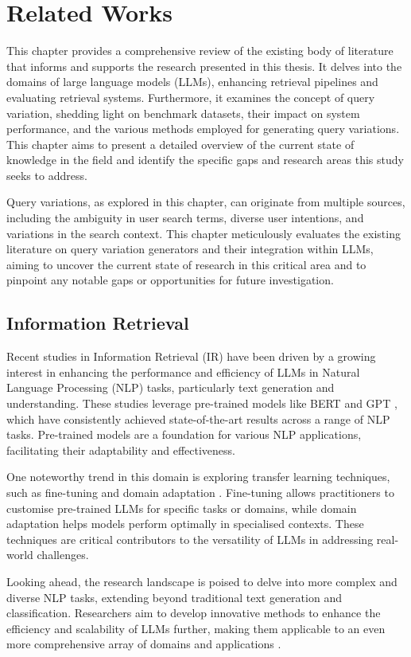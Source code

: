 \chapter{Related Works}
This chapter provides a comprehensive review of the existing body of literature that informs and supports the research presented in this thesis. It delves into the domains of large language models (LLMs), enhancing retrieval pipelines and evaluating retrieval systems. Furthermore, it examines the concept of query variation, shedding light on benchmark datasets, their impact on system performance, and the various methods employed for generating query variations. This chapter aims to present a detailed overview of the current state of knowledge in the field and identify the specific gaps and research areas this study seeks to address.

Query variations, as explored in this chapter, can originate from multiple sources, including the ambiguity in user search terms, diverse user intentions, and variations in the search context. This chapter meticulously evaluates the existing literature on query variation generators and their integration within LLMs, aiming to uncover the current state of research in this critical area and to pinpoint any notable gaps or opportunities for future investigation.

\section{Information Retrieval}
Recent studies in Information Retrieval (IR) have been driven by a growing interest in enhancing the performance and efficiency of LLMs in Natural Language Processing (NLP) tasks, particularly text generation and understanding. These studies leverage pre-trained models like BERT \cite{bert} and GPT \cite{gpt}, which have consistently achieved state-of-the-art results across a range of NLP tasks. Pre-trained models are a foundation for various NLP applications, facilitating their adaptability and effectiveness.

One noteworthy trend in this domain is exploring transfer learning techniques, such as fine-tuning \cite{bert} and domain adaptation \cite{wu}. Fine-tuning allows practitioners to customise pre-trained LLMs for specific tasks or domains, while domain adaptation helps models perform optimally in specialised contexts. These techniques are critical contributors to the versatility of LLMs in addressing real-world challenges.

Looking ahead, the research landscape is poised to delve into more complex and diverse NLP tasks, extending beyond traditional text generation and classification. Researchers aim to develop innovative methods to enhance the efficiency and scalability of LLMs further, making them applicable to an even more comprehensive array of domains and applications \cite{bailey, zuccon, benham}.

